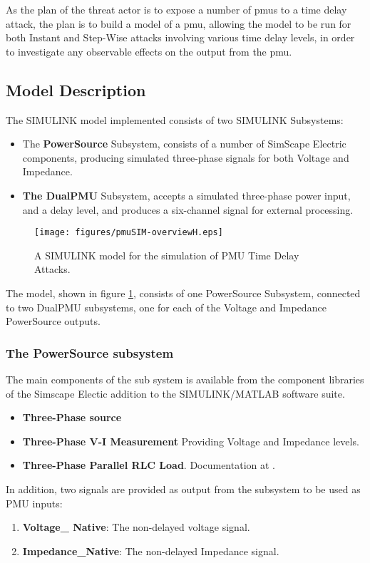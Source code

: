As the plan of the threat actor is to expose  a number of \acrshort{pmu}s to a time  delay attack, the plan is to build a model of a \acrshort{pmu}, allowing the model to be run for both Instant and Step-Wise attacks involving various time delay levels, in order to investigate any observable effects on the output from the \acrshort{pmu}.
\subsection{Model Description}
The SIMULINK model implemented consists of two SIMULINK Subsystems:
\begin{itemize}
    \item The \textbf{PowerSource} Subsystem, consists of a number of SimScape Electric components, producing simulated three-phase signals for both  Voltage and Impedance.
    \item \textbf{The DualPMU} Subsystem, accepts a simulated three-phase power input, and a delay level, and produces a six-channel signal for external processing. 
\end{itemize}

 \begin{figure}[t]
 \begin{center}
\texttt{[image: figures/pmuSIM-overviewH.eps]}
\caption[PmuSIM SIMULINK model]{A SIMULINK model for the simulation of PMU Time Delay Attacks.}
\label{fig:PMUsim-Overview}
     
 \end{center}
\end{figure}

The model, shown in figure \ref{fig:PMUsim-Overview}, consists of one PowerSource Subsystem, connected to two DualPMU subsystems, one for each of the Voltage and Impedance PowerSource outputs.

\subsubsection{The PowerSource subsystem}

The main components of the sub system is available from the component libraries of the Simscape Electic addition to the SIMULINK/MATLAB software suite.
\begin{itemize}
    \item \textbf{Three-Phase source} 
    \item \textbf{Three-Phase V-I Measurement}  Providing Voltage and Impedance levels.
    \item \textbf{Three-Phase Parallel RLC Load}. Documentation at \cite{mathworksImplementThreephase}. 
\end{itemize}
In addition, two signals are provided as output from the subsystem to be used as PMU inputs:
\begin{enumerate}
    \item \textbf{Voltage\_ Native}: The non-delayed voltage signal.
    \item \textbf{Impedance\_Native}: The non-delayed Impedance signal.
\end{enumerate}

